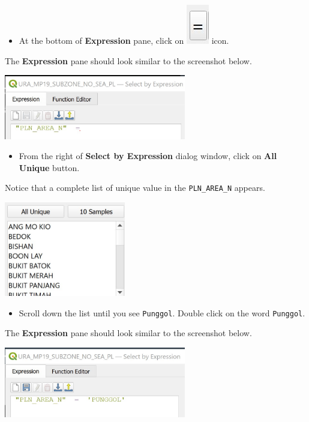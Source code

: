 \documentclass[
  letterpaper,
  DIV=11,
  numbers=noendperiod]{scrreprt}
\providecommand{\tightlist}{%
  \setlength{\itemsep}{0pt}\setlength{\parskip}{0pt}}\usepackage{longtable,booktabs,array}
\begin{document}
\begin{itemize}
\tightlist
\item
  At the bottom of \textbf{Expression} pane, click on
  \includegraphics{./img04/image7.jpg} icon.
\end{itemize}

The \textbf{Expression} pane should look similar to the screenshot
below.

\includegraphics[width=3.125in,height=\textheight]{./img04/image8.jpg}

\begin{itemize}
\tightlist
\item
  From the right of \textbf{Select by Expression} dialog window, click
  on \textbf{All Unique} button.
\end{itemize}

Notice that a complete list of unique value in the \texttt{PLN\_AREA\_N}
appears.

\includegraphics[width=2.08333in,height=\textheight]{./img04/image9.jpg}

\begin{itemize}
\tightlist
\item
  Scroll down the list until you see \texttt{Punggol}. Double click on
  the word \texttt{Punggol}.
\end{itemize}

The \textbf{Expression} pane should look similar to the screenshot
below.

\includegraphics[width=3.125in,height=\textheight]{./img04/image10.jpg}
\end{document}
